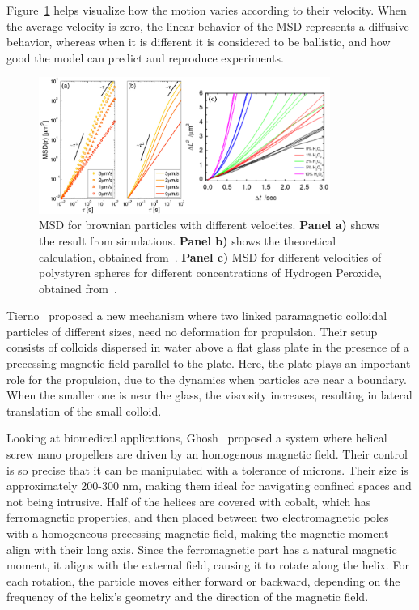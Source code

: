 Figure~\ref{fig:msddifferentvelocities} helps visualize how  the motion varies according to their velocity. When the average velocity is zero, the linear behavior of the MSD represents a diffusive behavior, whereas when it is different it is considered to be ballistic, and how good the model can predict and reproduce experiments. 

\begin{figure}[h]
  \begin{center}
    \includegraphics[width=0.85\textwidth]{figures/msdmicroscopicagents.pdf}
  \end{center}
  \caption[MSD for brownian particles]{MSD for brownian particles with different velocites. \textbf{Panel a)} shows the result from simulations. \textbf{Panel b)} shows the theoretical calculation, obtained from~\cite{volpe2014simulation}. \textbf{Panel c)} MSD for different velocities of polystyren spheres for different concentrations of Hydrogen Peroxide, obtained from~\cite{howse2007self}.}\label{fig:msddifferentvelocities}
\end{figure}

Tierno~\cite{tierno2008controlled} proposed a new mechanism where two linked paramagnetic colloidal particles of different sizes, need no deformation for propulsion. Their setup consists of colloids dispersed in water above a flat glass plate in the presence of a precessing magnetic field parallel to the plate. Here, the plate plays an important role for the propulsion, due to the dynamics when particles are near a boundary. When the smaller one is near the glass, the viscosity increases, resulting in lateral translation of the small colloid.


Looking at biomedical applications, Ghosh~\cite{ghosh2009controlled} proposed a system where helical screw nano propellers are driven by an homogenous magnetic field. Their control is so precise that it can be manipulated with a tolerance of microns. Their size is approximately 200-300 nm, making them ideal for navigating confined spaces and not being intrusive. Half of the helices are covered with cobalt, which has ferromagnetic properties, and then placed between two electromagnetic poles with a homogeneous precessing magnetic field, making the magnetic moment align with their long axis. Since the ferromagnetic part has a natural magnetic moment, it aligns with the external field, causing it to rotate along the helix. For each rotation, the particle moves either forward or backward, depending on the frequency of the helix's geometry and the direction of the magnetic field. 

